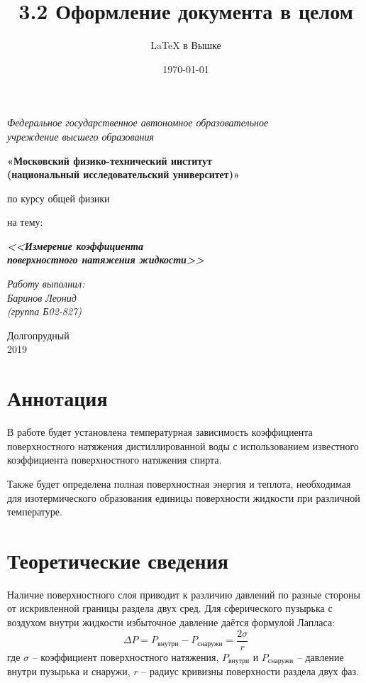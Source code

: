 \documentclass[a4paper,12pt]{article}
\author{\LaTeX{} в Вышке}
\title{3.2 Оформление документа в целом}
\date{\today}
\theoremstyle{plain} %
\theoremstyle{definition} %
\theoremstyle{remark} %
\begin{document}
	\thispagestyle{empty}
	\begin{center}
		\textit{Федеральное государственное автономное образовательное\\ учреждение высшего образования }
		\vspace{0.5ex}
		
		\textbf{«Московский физико-технический институт\\ (национальный исследовательский университет)»}
	\end{center}
	\vspace{10ex}
	\begin{center}
		\vspace{13ex}
		\vspace{1ex}
		
		по курсу общей физики
		
		
		на тему:
		
		\textbf{\textit{<<Измерение коэффициента\\ поверхностного натяжения жидкости>>}}
		\vspace{30ex}
		\begin{flushright}
			\noindent
			\textit{Работу выполнил:}
			\\
			\textit{Баринов Леонид \\(группа Б02-827)}
		\end{flushright}
		\vfill
		Долгопрудный \\2019
	\end{center}
	\newpage
	\setcounter{page}{1}
	\fancyhead[R]{\nouppercase{\leftmark}}
	\section{Аннотация}
	В работе будет установлена температурная зависимость  коэффициента поверхностного натяжения дистиллированной воды с использованием известного коэффициента поверхностного натяжения спирта.
	
	 Также будет определена полная поверхностная энергия  и теплота, необходимая для изотермического образования единицы  поверхности жидкости  при различной температуре. 
	\section {Теоретические сведения}
	Наличие поверхностного слоя приводит к различию давлений по разные стороны от искривленной границы раздела двух сред.  Для сферического пузырька с воздухом  внутри жидкости избыточное давление даётся формулой Лапласа:
	\begin{equation}
	\Delta P = P_\text{внутри} - P_\text{снаружи} = \frac{2\sigma}{r} 
	\end{equation}
	где $\sigma$ – коэффициент поверхностного натяжения, $P_\text{внутри}$ и $P_\text{снаружи}$ -- давление внутри пузырька и снаружи, $r$ -- радиус кривизны поверхности раздела двух фаз.
	
\end{document}
